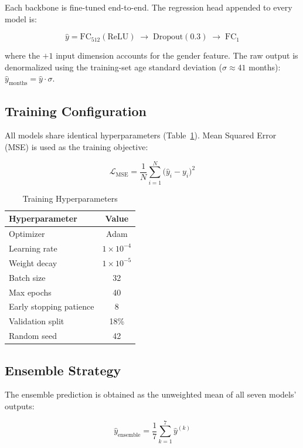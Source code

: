 \documentclass[conference]{IEEEtran}
\begin{document}
Each backbone is fine-tuned end-to-end. The regression head appended
to every model is:

\[
\hat{y} = \text{FC}_{512}(\text{ReLU}) \;\to\; \text{Dropout}(0.3)
         \;\to\; \text{FC}_{1}
\]

where the $+1$ input dimension accounts for the gender feature. The
raw output is denormalized using the training-set age standard
deviation ($\sigma \approx 41$ months): $\hat{y}_{\text{months}} =
\hat{y} \cdot \sigma$.

\subsection{Training Configuration}

All models share identical hyperparameters (Table~\ref{tab:hparams}).
Mean Squared Error (MSE) is used as the training objective:

\[
\mathcal{L}_{\text{MSE}} = \frac{1}{N}\sum_{i=1}^{N}
  \bigl(\hat{y}_i - y_i\bigr)^2
\]

\begin{table}[H]
\centering
\caption{Training Hyperparameters}
\label{tab:hparams}
\renewcommand{\arraystretch}{1.2}
\begin{tabular}{lc}
\toprule
\textbf{Hyperparameter} & \textbf{Value} \\
\midrule
Optimizer              & Adam \\
Learning rate          & $1 \times 10^{-4}$ \\
Weight decay           & $1 \times 10^{-5}$ \\
Batch size             & 32 \\
Max epochs             & 40 \\
Early stopping patience & 8 \\
Validation split       & 18\% \\
Random seed            & 42 \\
\bottomrule
\end{tabular}
\end{table}

\subsection{Ensemble Strategy}

The ensemble prediction is obtained as the unweighted mean of all
seven models' outputs:

\[
\hat{y}_{\text{ensemble}} = \frac{1}{7}\sum_{k=1}^{7} \hat{y}^{(k)}
\]
\end{document}
